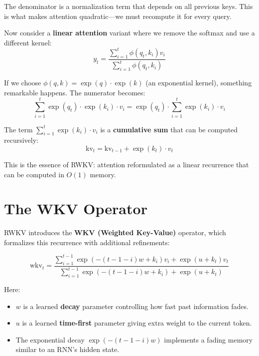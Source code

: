 \documentclass[12pt]{article}
\begin{document}
The denominator is a normalization term that depends on all previous keys. This is what makes attention quadratic—we must recompute it for every query.

Now consider a \textbf{linear attention} variant where we remove the softmax and use a different kernel:
\begin{equation}
    y_t = \frac{\sum_{i=1}^{t} \phi(q_t, k_i) v_i}{\sum_{i=1}^{t} \phi(q_t, k_i)}
\end{equation}

If we choose $\phi(q, k) = \exp(q) \cdot \exp(k)$ (an exponential kernel), something remarkable happens. The numerator becomes:
\begin{equation}
    \sum_{i=1}^{t} \exp(q_t) \cdot \exp(k_i) \cdot v_i = \exp(q_t) \cdot \sum_{i=1}^{t} \exp(k_i) \cdot v_i
\end{equation}

The term $\sum_{i=1}^{t} \exp(k_i) \cdot v_i$ is a \textbf{cumulative sum} that can be computed recursively:
\begin{equation}
    \text{kv}_t = \text{kv}_{t-1} + \exp(k_t) \cdot v_t
\end{equation}

This is the essence of RWKV: attention reformulated as a linear recurrence that can be computed in $O(1)$ memory.

\section*{The WKV Operator}

RWKV introduces the \textbf{WKV (Weighted Key-Value)} operator, which formalizes this recurrence with additional refinements:

\begin{equation}
    \text{wkv}_t = \frac{\sum_{i=1}^{t-1} \exp(-(t-1-i)w + k_i) v_i + \exp(u + k_t) v_t}{\sum_{i=1}^{t-1} \exp(-(t-1-i)w + k_i) + \exp(u + k_t)}
\end{equation}

Here:
\begin{itemize}
    \item $w$ is a learned \textbf{decay} parameter controlling how fast past information fades.
    \item $u$ is a learned \textbf{time-first} parameter giving extra weight to the current token.
    \item The exponential decay $\exp(-(t-1-i)w)$ implements a fading memory similar to an RNN's hidden state.
\end{itemize}
\end{document}
